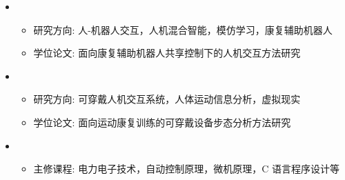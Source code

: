   \begin{itemize}[leftmargin=*]
    \item
      {\small
      \begin{itemize}
        \item{研究方向: 人-机器人交互，人机混合智能，模仿学习，康复辅助机器人}
        \item{学位论文: 面向康复辅助机器人共享控制下的人机交互方法研究}
      \end{itemize}}
      
    \item
      {\small
      \begin{itemize}
        \item{研究方向: 可穿戴人机交互系统，人体运动信息分析，虚拟现实}
        \item{学位论文: 面向运动康复训练的可穿戴设备步态分析方法研究}
      \end{itemize}
      }

      \item
      {\small
      \begin{itemize}
        \item{主修课程: 电力电子技术，自动控制原理，微机原理，C 语言程序设计等}
      \end{itemize}
      }

  \end{itemize}